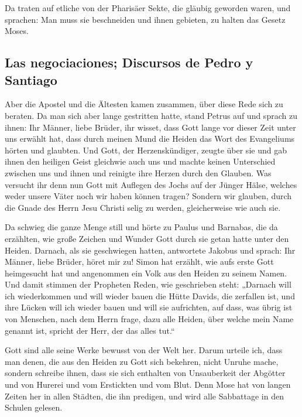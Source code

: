  Da traten auf etliche von der Pharisäer Sekte, die
gläubig geworden waren, und sprachen: Man muss sie beschneiden und ihnen
gebieten, zu halten das Gesetz Moses.

\hypertarget{las-negociaciones-discursos-de-pedro-y-santiago}{%
\subsection{Las negociaciones; Discursos de Pedro y
Santiago}\label{las-negociaciones-discursos-de-pedro-y-santiago}}

 Aber die Apostel und die Ältesten kamen zusammen, über
diese Rede sich zu beraten.  Da man sich aber lange
gestritten hatte, stand Petrus auf und sprach zu ihnen: Ihr Männer,
liebe Brüder, ihr wisset, dass Gott lange vor dieser Zeit unter uns
erwählt hat, dass durch meinen Mund die Heiden das Wort des Evangeliums
hörten und glaubten.  Und Gott, der Herzenskündiger,
zeugte über sie und gab ihnen den heiligen Geist gleichwie auch uns
 und machte keinen Unterschied zwischen uns und ihnen und
reinigte ihre Herzen durch den Glauben.  Was versucht ihr
denn nun Gott mit Auflegen des Jochs auf der Jünger Hälse, welches weder
unsere Väter noch wir haben können tragen?  Sondern wir
glauben, durch die Gnade des Herrn Jesu Christi selig zu werden,
gleicherweise wie auch sie.

 Da schwieg die ganze Menge still und hörte zu Paulus und
Barnabas, die da erzählten, wie große Zeichen und Wunder Gott durch sie
getan hatte unter den Heiden.  Darnach, als sie
geschwiegen hatten, antwortete Jakobus und sprach: Ihr Männer, liebe
Brüder, höret mir zu!  Simon hat erzählt, wie aufs erste
Gott heimgesucht hat und angenommen ein Volk aus den Heiden zu seinem
Namen.  Und damit stimmen der Propheten Reden, wie
geschrieben steht:  „Darnach will ich wiederkommen und
will wieder bauen die Hütte Davids, die zerfallen ist, und ihre Lücken
will ich wieder bauen und will sie aufrichten,  auf dass,
was übrig ist von Menschen, nach dem Herrn frage, dazu alle Heiden, über
welche mein Name genannt ist, spricht der Herr, der das alles tut.``

 Gott sind alle seine Werke bewusst von der Welt her.
 Darum urteile ich, dass man denen, die aus den Heiden zu
Gott sich bekehren, nicht Unruhe mache,  sondern schreibe
ihnen, dass sie sich enthalten von Unsauberkeit der Abgötter und von
Hurerei und vom Erstickten und vom Blut.  Denn Mose hat
von langen Zeiten her in allen Städten, die ihn predigen, und wird alle
Sabbattage in den Schulen gelesen.


